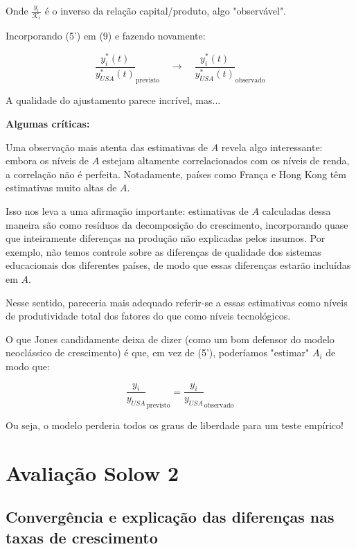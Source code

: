 \documentclass[a4paper,12pt]{article}[abntex2]
\begin{document}
Onde \( \frac{y_i}{\mathcal{K}_i} \) é o inverso da relação capital/produto, algo "observável".

Incorporando (5') em (9) e fazendo novamente:

\[
\frac{y_i^*(t)}{y_{USA}^*(t)}_{\text{previsto}} \quad \longrightarrow \quad \frac{y_i^*(t)}{y_{USA}^*(t)}_{\text{observado}}
\]

A qualidade do ajustamento parece incrível, mas...

\textbf{Algumas críticas:}

Uma observação mais atenta das estimativas de \( A \) revela algo interessante: embora os níveis de \( A \) estejam altamente correlacionados com os níveis de renda, a correlação não é perfeita. Notadamente, países como França e Hong Kong têm estimativas muito altas de \( A \). 

Isso nos leva a uma afirmação importante: estimativas de \( A \) calculadas dessa maneira são como resíduos da decomposição do crescimento, incorporando quase que inteiramente diferenças na produção não explicadas pelos insumos. Por exemplo, não temos controle sobre as diferenças de qualidade dos sistemas educacionais dos diferentes países, de modo que essas diferenças estarão incluídas em \( A \). 

Nesse sentido, pareceria mais adequado referir-se a essas estimativas como níveis de produtividade total dos fatores do que como níveis tecnológicos.

O que Jones candidamente deixa de dizer (como um bom defensor do modelo neoclássico de crescimento) é que, em vez de (5'), poderíamos "estimar" \( A_i \) de modo que:

\[
\frac{y_i}{y_{USA}}_{\text{previsto}} = \frac{y_i}{y_{USA}}_{\text{observado}}
\]

Ou seja, o modelo perderia todos os graus de liberdade para um teste empírico!

\newpage
\section{\textbf{Avaliação Solow 2}}

\subsection{\textbf{Convergência e explicação das diferenças nas taxas de crescimento}}
\end{document}
